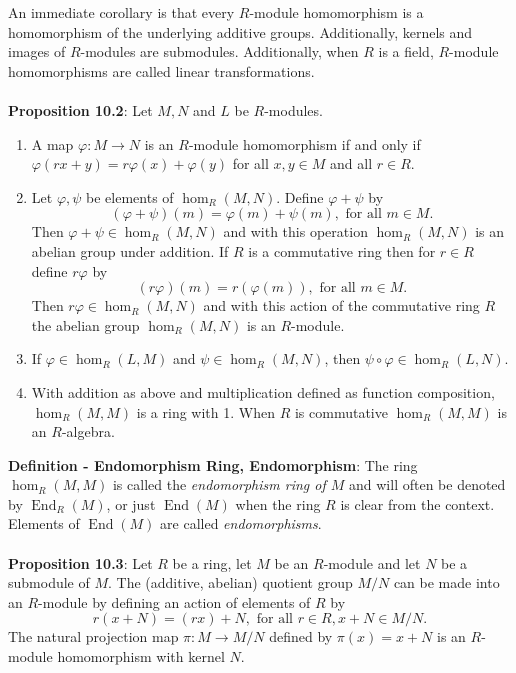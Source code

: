 \documentclass{article}
\DeclareMathOperator{\End}{End}
\begin{document}
An immediate corollary is that every $R$-module homomorphism is a homomorphism of the underlying additive groups. Additionally, kernels and images of $R$-modules are submodules. Additionally, when $R$ is a field, $R$-module homomorphisms are called linear transformations. \\ \\
\textbf{Proposition 10.2}: Let $M, N$ and $L$ be $R$-modules. \begin{enumerate}
    \item A map $\varphi: M \rightarrow N$ is an $R$-module homomorphism if and only if $\varphi(rx + y) = r\varphi(x) + \varphi(y)$ for all $x, y \in M$ and all $r \in R$.
    \item Let $\varphi, \psi$ be  elements of $\hom_R(M, N)$. Define $\varphi + \psi$ by $$(\varphi + \psi)(m) = \varphi(m) + \psi(m), \text{ for all } m \in M.$$ Then $\varphi + \psi \in \hom_R(M, N)$ and with this operation $\hom_R(M, N)$ is an abelian group under addition. If $R$ is a commutative ring then for $r \in R$ define $r\varphi$ by $$(r\varphi)(m) = r(\varphi(m)), \text{ for all } m \in M.$$ Then $r\varphi \in \hom_R(M, N)$ and with this action of the commutative ring $R$ the abelian group $\hom_R(M, N)$ is an $R$-module.
    \item If $\varphi \in \hom_R(L, M)$ and $\psi \in \hom_R(M, N)$, then $\psi \circ \varphi \in \hom_R(L, N)$.
    \item With addition as above and multiplication defined as function composition, $\hom_R(M, M)$ is a ring with 1. When $R$ is commutative $\hom_R(M, M)$ is an $R$-algebra.
\end{enumerate} $ $ \\
\textbf{Definition - Endomorphism Ring, Endomorphism}: The ring $\hom_R(M, M)$ is called the \textit{endomorphism ring of $M$} and will often be denoted by $\End_R(M)$, or just $\End(M)$ when the ring $R$ is clear from the context. Elements of $\End(M)$ are called \textit{endomorphisms}. \\ \\
\textbf{Proposition 10.3}: Let $R$ be a ring, let $M$ be an $R$-module and let $N$ be a submodule of $M$. The (additive, abelian) quotient group $M / N$ can be made into an $R$-module by defining an action of elements of $R$ by $$r(x + N) = (rx) + N, \text{ for all } r \in R, x + N \in M/N.$$ The natural projection map $\pi: M \rightarrow M/N$ defined by $\pi(x) = x + N$ is an $R$-module homomorphism with kernel $N$. \\ \\
\end{document}
